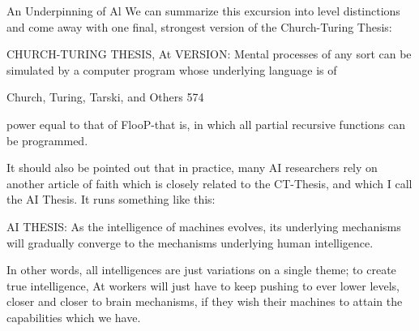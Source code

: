 {                                An Underpinning of Al
We can summarize this excursion into level distinctions and come away with one final,
strongest version of the Church-Turing Thesis:

CHURCH-TURING THESIS, At VERSION: Mental processes of any sort can be
simulated by a computer program whose underlying language is of




Church, Turing, Tarski, and Others                                                         574

power equal to that of FlooP-that is, in which all partial recursive functions can be
programmed.

        It should also be pointed out that in practice, many AI researchers rely on another
article of faith which is closely related to the CT-Thesis, and which I call the AI Thesis. It
runs something like this:

   AI THESIS:       As the intelligence of machines evolves, its underlying
      mechanisms will gradually converge to the mechanisms underlying human
      intelligence.

In other words, all intelligences are just variations on a single theme; to create true
intelligence, At workers will just have to keep pushing to ever lower levels, closer and
closer to brain mechanisms, if they wish their machines to attain the capabilities which
we have.

}
